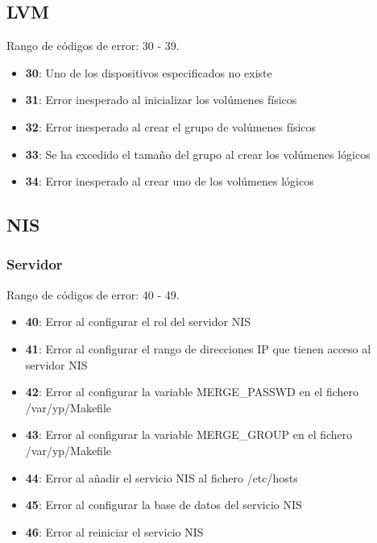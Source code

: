 \documentclass[12pt,a4paper, spanish]{article}
\begin{document}
\subsection{LVM}
Rango de códigos de error: 30 - 39.
\begin{itemize}
\item \textbf{30}: Uno de los dispositivos especificados no existe
\item \textbf{31}: Error inesperado al inicializar los volúmenes físicos
\item \textbf{32}: Error inesperado al crear el grupo de volúmenes físicos
\item \textbf{33}: Se ha excedido el tamaño del grupo al crear los volúmenes lógicos
\item \textbf{34}: Error inesperado al crear uno de los volúmenes lógicos
\end{itemize}

\subsection{NIS}

\subsubsection{Servidor}
Rango de códigos de error: 40 - 49.
\begin{itemize}
\item \textbf{40}: Error al configurar el rol del servidor NIS
\item \textbf{41}: Error al configurar el rango de direcciones IP que tienen acceso al servidor NIS
\item \textbf{42}: Error al configurar la variable MERGE\_PASSWD en el fichero /var/yp/Makefile
\item \textbf{43}: Error al configurar la variable MERGE\_GROUP en el fichero /var/yp/Makefile
\item \textbf{44}: Error al añadir el servicio NIS al fichero /etc/hosts
\item \textbf{45}: Error al configurar la base de datos del servicio NIS
\item \textbf{46}: Error al reiniciar el servicio NIS
\end{itemize}
\end{document}
